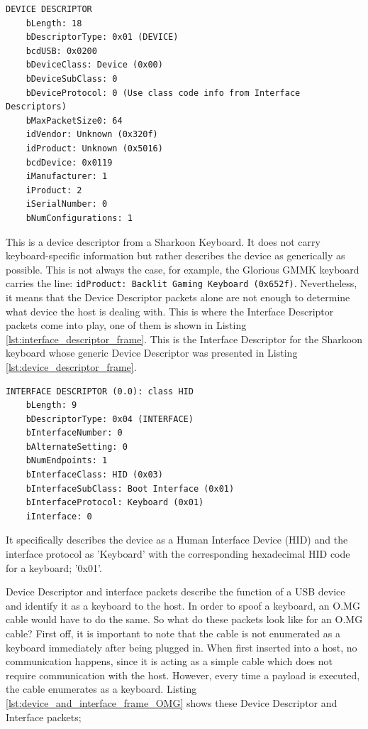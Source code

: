 \begin{lstlisting}[caption={Device Descriptor packet generated by an external keyboard},label={lst:device_descriptor_frame}, captionpos=b]
DEVICE DESCRIPTOR
    bLength: 18
    bDescriptorType: 0x01 (DEVICE)
    bcdUSB: 0x0200
    bDeviceClass: Device (0x00)
    bDeviceSubClass: 0
    bDeviceProtocol: 0 (Use class code info from Interface Descriptors)
    bMaxPacketSize0: 64
    idVendor: Unknown (0x320f)
    idProduct: Unknown (0x5016)
    bcdDevice: 0x0119
    iManufacturer: 1
    iProduct: 2
    iSerialNumber: 0
    bNumConfigurations: 1
\end{lstlisting}


This is a device descriptor from a Sharkoon Keyboard. It does not carry keyboard-specific information but rather describes the device as generically as possible. This is not always the case, for example, the Glorious GMMK keyboard carries the line: \verb|idProduct: Backlit Gaming Keyboard (0x652f)|. Nevertheless,
it means that the Device Descriptor packets alone are not enough to determine what device the host is dealing with. This is where the Interface Descriptor packets come into play, one of them is shown in Listing \ref{lst:interface_descriptor_frame}.
This is the Interface Descriptor for the Sharkoon keyboard whose generic Device Descriptor was presented in Listing \ref{lst:device_descriptor_frame}.

\begin{lstlisting}[caption={Interface Descriptor packet generated by an external keyboard}, label={lst:interface_descriptor_frame}, captionpos=b]
INTERFACE DESCRIPTOR (0.0): class HID
    bLength: 9
    bDescriptorType: 0x04 (INTERFACE)
    bInterfaceNumber: 0
    bAlternateSetting: 0
    bNumEndpoints: 1
    bInterfaceClass: HID (0x03)
    bInterfaceSubClass: Boot Interface (0x01)
    bInterfaceProtocol: Keyboard (0x01)
    iInterface: 0
\end{lstlisting}

It specifically describes the device as a Human Interface Device (HID) and the interface protocol as 'Keyboard' with the corresponding hexadecimal HID code for a keyboard; '0x01'.

Device Descriptor and interface packets describe the function of a USB device and identify it as a keyboard to the host. In order to spoof a keyboard, an O.MG cable would have to do the same. So what do these packets look like for an O.MG cable?
First off, it is important to note that the cable is not enumerated as a keyboard immediately after being plugged in. When first inserted into a host, no communication happens, since it is acting as a simple cable which does not require communication with the host. However, every time a payload is executed, the cable enumerates as a keyboard.
Listing \ref{lst:device_and_interface_frame_OMG} shows these Device Descriptor and Interface packets;

